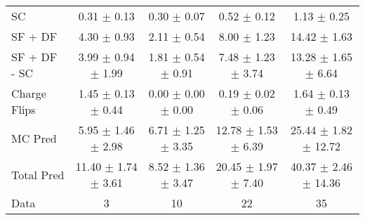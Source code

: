 \begin{tabular}{l|cccc}
                                 SC &  0.31 $\pm$  0.13 &  0.30 $\pm$  0.07 &  0.52 $\pm$  0.12 &  1.13 $\pm$  0.25 \\
                            SF + DF &  4.30 $\pm$  0.93 &  2.11 $\pm$  0.54 &  8.00 $\pm$  1.23 & 14.42 $\pm$  1.63 \\
\hline
                       SF + DF - SC &  3.99 $\pm$  0.94 $\pm$  1.99 &  1.81 $\pm$  0.54 $\pm$  0.91 &  7.48 $\pm$  1.23 $\pm$  3.74 & 13.28 $\pm$  1.65 $\pm$  6.64 \\
\hline\hline
                       Charge Flips &  1.45 $\pm$  0.13 $\pm$  0.44 &  0.00 $\pm$  0.00 $\pm$  0.00 &  0.19 $\pm$  0.02 $\pm$  0.06 &  1.64 $\pm$  0.13 $\pm$  0.49 \\
\hline
                            MC Pred &  5.95 $\pm$  1.46 $\pm$  2.98 &  6.71 $\pm$  1.25 $\pm$  3.35 & 12.78 $\pm$  1.53 $\pm$  6.39 & 25.44 $\pm$  1.82 $\pm$ 12.72 \\
\hline
                         Total Pred & 11.40 $\pm$  1.74 $\pm$  3.61 &  8.52 $\pm$  1.36 $\pm$  3.47 & 20.45 $\pm$  1.97 $\pm$  7.40 & 40.37 $\pm$  2.46 $\pm$ 14.36 \\
\hline\hline
                               Data &     3 &    10 &    22 &    35 \\
\hline\hline
\end{tabular}

